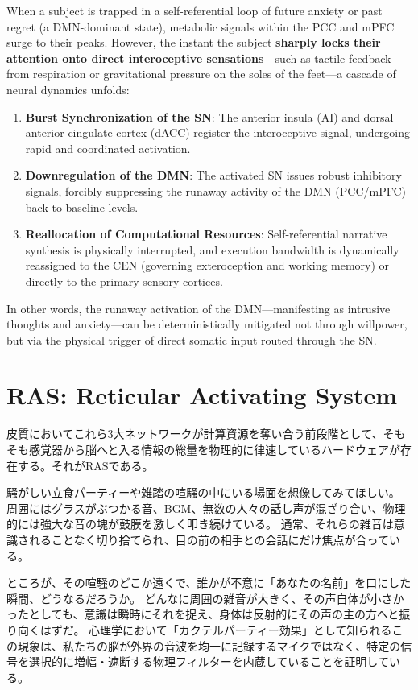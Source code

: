     

    When a subject is trapped in a self-referential loop of future anxiety or past regret (a DMN-dominant state), metabolic signals within the PCC and mPFC surge to their peaks. However, the instant the subject \textbf{sharply locks their attention onto direct interoceptive sensations}—such as tactile feedback from respiration or gravitational pressure on the soles of the feet—a cascade of neural dynamics unfolds:

    \begin{enumerate}[label=(\arabic*)]
        \item \textbf{Burst Synchronization of the SN}: The anterior insula (AI) and dorsal anterior cingulate cortex (dACC) register the interoceptive signal, undergoing rapid and coordinated activation.
        \item \textbf{Downregulation of the DMN}: The activated SN issues robust inhibitory signals, forcibly suppressing the runaway activity of the DMN (PCC/mPFC) back to baseline levels.
        \item \textbf{Reallocation of Computational Resources}: Self-referential narrative synthesis is physically interrupted, and execution bandwidth is dynamically reassigned to the CEN (governing exteroception and working memory) or directly to the primary sensory cortices.
    \end{enumerate}

    In other words, the runaway activation of the DMN—manifesting as intrusive thoughts and anxiety—can be deterministically mitigated not through willpower, but via the physical trigger of direct somatic input routed through the SN.
\fi

\ifja
\section{RAS: Reticular Activating System}
皮質においてこれら3大ネットワークが計算資源を奪い合う前段階として、そもそも感覚器から脳へと入る情報の総量を物理的に律速しているハードウェアが存在する。それがRASである。

騒がしい立食パーティーや雑踏の喧騒の中にいる場面を想像してみてほしい。
周囲にはグラスがぶつかる音、BGM、無数の人々の話し声が混ざり合い、物理的には強大な音の塊が鼓膜を激しく叩き続けている。
通常、それらの雑音は意識されることなく切り捨てられ、目の前の相手との会話にだけ焦点が合っている。

ところが、その喧騒のどこか遠くで、誰かが不意に「あなたの名前」を口にした瞬間、どうなるだろうか。
どんなに周囲の雑音が大きく、その声自体が小さかったとしても、意識は瞬時にそれを捉え、身体は反射的にその声の主の方へと振り向くはずだ。
心理学において「カクテルパーティー効果」として知られるこの現象は、私たちの脳が外界の音波を均一に記録するマイクではなく、特定の信号を選択的に増幅・遮断する物理フィルターを内蔵していることを証明している。

